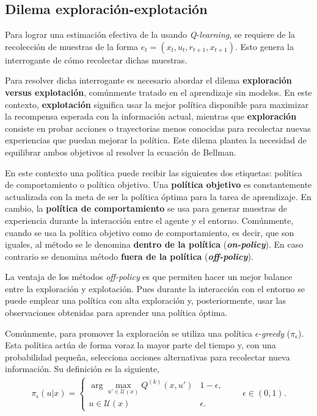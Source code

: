 \subsection{Dilema exploración-explotación}
\label{sec:exp_vs_exp}
Para lograr una estimación efectiva de la  usando \textit{Q-learning}, se requiere de la recolección de muestras de la forma $e_t=(x_t, u_t, r_{t+1}, x_{t+1})$. Esto genera la interrogante de cómo recolectar dichas muestras. 

Para resolver dicha interrogante es necesario abordar el dilema \textbf{exploración versus explotación}, comúnmente tratado en el aprendizaje sin modelos. En este contexto, \textbf{explotación} significa usar la mejor política disponible para maximizar la recompensa esperada con la información actual, mientras que \textbf{exploración} consiste en probar acciones o trayectorias menos conocidas para recolectar nuevas experiencias que puedan mejorar la política. Este dilema plantea la necesidad de equilibrar ambos objetivos al resolver la ecuación de Bellman. \cite{Sutton2018}

En este contexto una política puede recibir las siguientes dos etiquetas: política de comportamiento o política objetivo. Una \textbf{política objetivo} es constantemente actualizada con la meta de ser la política óptima para la tarea de aprendizaje. En cambio, la \textbf{política de comportamiento} se usa para generar muestras de experiencia durante la interacción entre el agente y el entorno. Comúnmente, cuando se usa la política objetivo como de comportamiento, es decir, que son iguales, al método se le denomina \textbf{dentro de la política} (\textit{\textbf{on-policy}}). En caso contrario se denomina método \textbf{fuera de la política} (\textit{\textbf{off-policy}}).\cite{Shiyu2022}

La ventaja de los métodos \textit{off-policy} es que permiten hacer un mejor balance entre la exploración y explotación. Pues durante la interacción con el entorno se puede emplear una política con alta exploración y, posteriormente, usar las observaciones obtenidas para aprender una política óptima.

Comúnmente, para promover la exploración se utiliza una política $\epsilon$-\textit{greedy} ($\pi_{\epsilon}$). Esta política actúa de forma voraz la mayor parte del tiempo y, con una probabilidad pequeña, selecciona acciones alternativas para recolectar nueva información. Su definición es la siguiente, 
\begin{align}
\label{eq:epsilon_greedy}
\pi_{\epsilon}(u|x) = 
\begin{cases}
\arg\max_{u'\in\mathcal{U}(x)} Q^{(k)}(x, u') &  1-\epsilon, \\
 u \in \mathcal{U}(x) & \epsilon.
\end{cases}  \qquad
\epsilon \in (0, 1).
\end{align}

